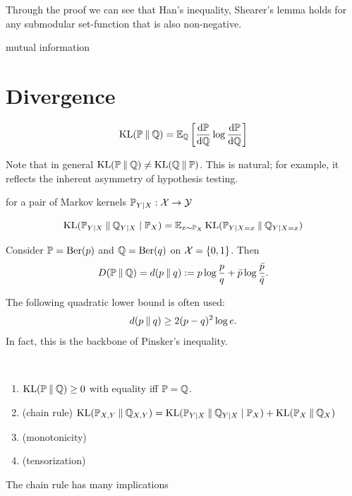 Through the proof we can see that Han's inequality, 
Shearer's lemma holds for any submodular set-function that is also non-negative.

\begin{example}
    mutual information 
\end{example}

\section{Divergence}
\begin{definition}
    \[\operatorname{KL}(\mathbb{P}\mathbin{\|} \mathbb{Q})=\mathbb{E}_{\mathbb{Q}}\left[\frac{\mathrm{d}\mathbb{P}}{\mathrm{d}\mathbb{Q}}\log \frac{\mathrm{d}\mathbb{P}}{\mathrm{d}\mathbb{Q}}\right]\]
\end{definition}
Note that in general $\operatorname{KL}(\mathbb{P}\mathbin{\|} \mathbb{Q})\neq \operatorname{KL}(\mathbb{Q}\mathbin{\|} \mathbb{P})$. 
This is natural; for example, it reflects the inherent asymmetry of hypothesis testing.


for a pair of Markov kernels $\mathbb{P}_{Y|X}:\mathcal{X}\to\mathcal{Y}$
\begin{definition}
    \[\operatorname{KL}(\mathbb{P}_{Y|X}\mathbin{\|} \mathbb{Q}_{Y|X}\mid\mathbb{P}_X)=\mathbb{E}_{x\sim \mathbb{P}_X}\operatorname{KL}(\mathbb{P}_{Y|X=x}\mathbin{\|} \mathbb{Q}_{Y|X=x})\]
\end{definition}

\begin{example}
    Consider $\mathbb{P}=\text{Ber}(p)$ and $\mathbb{Q}=\text{Ber}(q)$ on $\mathcal{X}=\{0,1\}$. Then 
    \[D(\mathbb{P}\mathbin{\|}\mathbb{Q})=d(p\mathbin{\|} q):=p\log\frac{p}{q}+\bar{p}\log\frac{\bar{p}}{\bar{q}}.\]

    The following quadratic lower bound is often used:
    \[d(p\mathbin{\|} q)\geq 2(p-q)^2\log e.\]
    In fact, this is the backbone of Pinsker's inequality.
\end{example}

\begin{proposition}
    \
    \begin{enumerate}[label=(\roman*)]
        \item $\operatorname{KL}(\mathbb{P}\mathbin{\|}\mathbb{Q})\geq 0$ with equality iff $\mathbb{P}=\mathbb{Q}$.
        \item \textnormal{(chain rule)} $\operatorname{KL}(\mathbb{P}_{X,Y}\mathbin{\|}\mathbb{Q}_{X,Y})=\operatorname{KL}(\mathbb{P}_{Y|X}\mathbin{\|} \mathbb{Q}_{Y|X}\mid\mathbb{P}_X)+\operatorname{KL}(\mathbb{P}_X\mathbin{\|} \mathbb{Q}_X)$
        \item \textnormal{(monotonicity)}
        \item \textnormal{(tensorization)} 
    \end{enumerate}
\end{proposition}

The chain rule has many implications

